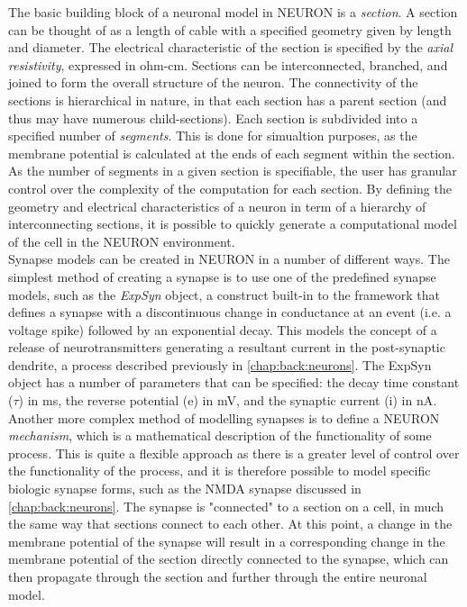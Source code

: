The basic building block of a neuronal model in NEURON is a \emph{section}. A section can be thought of as a length of cable with a specified geometry given by length and diameter. The electrical characteristic of the section is specified by the \emph{axial resistivity}, expressed in ohm-cm. Sections can be interconnected, branched, and joined to form the overall structure of the neuron. The connectivity of the sections is hierarchical in nature, in that each section has a parent section (and thus may have numerous child-sections). Each section is subdivided into a specified number of \emph{segments}. This is done for simualtion purposes, as the membrane potential is calculated at the ends of each segment within the section. As the number of segments in a given section is specifiable, the user has granular control over the complexity of the computation for each section. By defining the geometry and electrical characteristics of a neuron in term of a hierarchy of interconnecting sections, it is possible to quickly generate a computational model of the cell in the NEURON environment.
\\
Synapse models can be created in NEURON in a number of different ways. The simplest method of creating a synapse is to use one of the predefined synapse models, such as the \emph{ExpSyn} object, a construct built-in to the framework that defines a synapse with a discontinuous change in conductance at an event (i.e. a voltage spike) followed by an exponential decay. This models the concept of a release of neurotransmitters generating a resultant current in the post-synaptic dendrite, a process described previously in \ref{chap:back:neurons}. The ExpSyn object has a number of parameters that can be specified: the decay time constant ($\tau$) in ms, the reverse potential (e) in mV, and the synaptic current (i) in nA. Another more complex method of modelling synapses is to define a NEURON \emph{mechanism}, which is a mathematical description of the functionality of some process. This is quite a flexible approach as there is a greater level of control over the functionality of the process, and it is therefore possible to model specific biologic synapse forms, such as the NMDA synapse discussed in \ref{chap:back:neurons}. 
The synapse is "connected" to a section on a cell, in much the same way that sections connect to each other. At this point, a change in the membrane potential of the synapse will result in a corresponding change in the membrane potential of the section directly connected to the synapse, which can then propagate through the section and further through the entire neuronal model.
